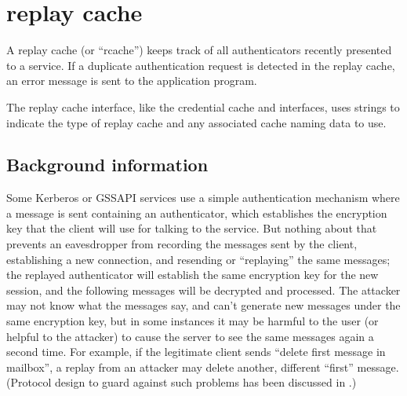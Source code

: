 \documentclass[letterpaper,10pt,english]{sphinxmanual}
\begin{document}
\sphinxstepscope


\chapter{replay cache}
\label{\detokenize{basic/rcache_def:replay-cache}}\label{\detokenize{basic/rcache_def:rcache-definition}}\label{\detokenize{basic/rcache_def::doc}}
\sphinxAtStartPar
A replay cache (or “rcache”) keeps track of all authenticators
recently presented to a service.  If a duplicate authentication
request is detected in the replay cache, an error message is sent to
the application program.

\sphinxAtStartPar
The replay cache interface, like the credential cache and
{\hyperref[\detokenize{basic/keytab_def:keytab-definition}]{}} interfaces, uses  strings to
indicate the type of replay cache and any associated cache naming
data to use.


\section{Background information}
\label{\detokenize{basic/rcache_def:background-information}}
\sphinxAtStartPar
Some Kerberos or GSSAPI services use a simple authentication mechanism
where a message is sent containing an authenticator, which establishes
the encryption key that the client will use for talking to the
service.  But nothing about that prevents an eavesdropper from
recording the messages sent by the client, establishing a new
connection, and re\sphinxhyphen{}sending or “replaying” the same messages; the
replayed authenticator will establish the same encryption key for the
new session, and the following messages will be decrypted and
processed.  The attacker may not know what the messages say, and can’t
generate new messages under the same encryption key, but in some
instances it may be harmful to the user (or helpful to the attacker)
to cause the server to see the same messages again a second time.  For
example, if the legitimate client sends “delete first message in
mailbox”, a replay from an attacker may delete another, different
“first” message.  (Protocol design to guard against such problems has
been discussed in .)
\end{document}
